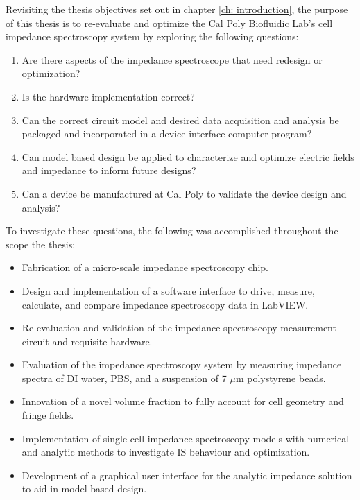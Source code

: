 \label{ch: discussion}



Revisiting the thesis objectives set out in chapter \ref{ch: introduction}, the purpose of this thesis is to re-evaluate and optimize the Cal Poly Biofluidic Lab's cell impedance spectroscopy system by exploring the following questions:

\begin{enumerate}
    \item Are there aspects of the impedance spectroscope that need redesign or optimization?
    \item Is the hardware implementation correct?
    \item Can the correct circuit model and desired data acquisition and analysis be packaged and incorporated in a device interface computer program?
    \item Can model based design be applied to characterize and optimize electric fields and impedance to inform future designs?
    \item Can a device be manufactured at Cal Poly to validate the device design and analysis?
\end{enumerate}

\par To investigate these questions, the following was accomplished throughout the scope the thesis:
\begin{itemize}
    \item Fabrication of a micro-scale impedance spectroscopy chip.
    \item Design and implementation of a software interface to drive, measure, calculate, and compare impedance spectroscopy data in LabVIEW.
    \item Re-evaluation and validation of the impedance spectroscopy measurement circuit and requisite hardware.
    \item Evaluation of the impedance spectroscopy system by measuring impedance spectra of DI water, PBS, and a suspension of 7 $\mu$m polystyrene beads.
    \item Innovation of a novel volume fraction to fully account for cell geometry and fringe fields.
    \item Implementation of single-cell impedance spectroscopy models with numerical and analytic methods to investigate IS behaviour and optimization.
    \item Development of a graphical user interface for the analytic impedance solution to aid in model-based design.
\end{itemize}

